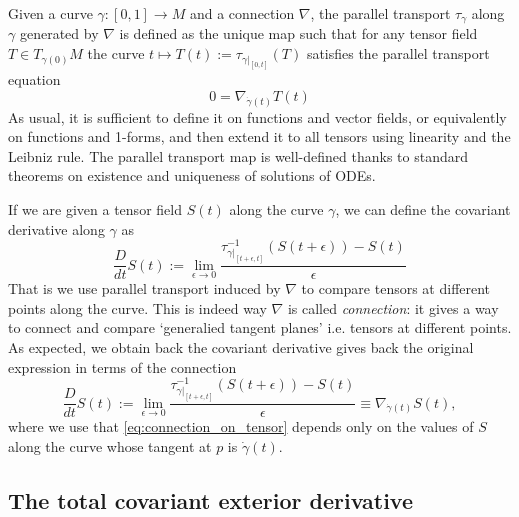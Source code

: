 \begin{mytheorem}
Given a curve $\gamma: [0,1] \to M$ and a connection $\nabla$, the parallel transport $\tau_{\gamma}$ along $\gamma$ generated by $\nabla$ is defined as the unique map such that for any tensor field $T\in T_{\gamma(0)} M$ the curve $t \mapsto T(t) := \tau_{\gamma|_{[0,t]}} (T)$ satisfies the parallel transport equation
\begin{equation}
    0 = \nabla_{\dot{\gamma}(t)} T(t) 
\end{equation}
As usual, it is sufficient to define it on functions and vector fields, or equivalently on functions and 1-forms, and then extend it to all tensors using linearity and the Leibniz rule.
The parallel transport map is well-defined thanks to standard theorems on existence and uniqueness of solutions of ODEs.

If we are given a tensor field $S(t)$ along the curve $\gamma$, we can define the covariant derivative along $\gamma$ as
\begin{equation}
    \frac{D}{dt}S(t) := \lim_{\epsilon \to 0} \frac{\tau_{\gamma|_{[t+\epsilon,t]}}^{-1} (S(t+\epsilon)) - S(t)}{\epsilon} 
\end{equation}
That is we use parallel transport induced by $\nabla$ to compare tensors at different points along the curve.
This is indeed way $\nabla$ is called \emph{connection}: it gives a way to connect and compare `generalied tangent planes' i.e. tensors at different points.
As expected, we obtain back the covariant derivative gives back the original expression in terms of the connection
\begin{equation}
    \frac{D}{dt}S(t) := \lim_{\epsilon \to 0} \frac{\tau_{\gamma|_{[t+\epsilon,t]}}^{-1} (S(t+\epsilon)) - S(t)}{\epsilon}
    \equiv \nabla_{\dot{\gamma}(t)} S(t),
\end{equation}
where we use that \eqref{eq:connection_on_tensor} depends only on the values of $S$ along the curve whose tangent at $p$ is $\dot{\gamma}(t)$.
\end{mytheorem}



\subsection{The total covariant exterior derivative}

